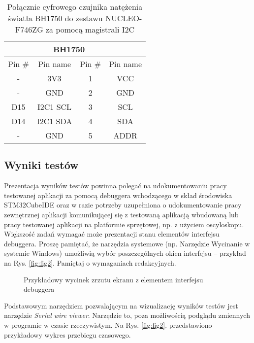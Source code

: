 \documentclass[11pt, a4paper]{article}
\begin{document}
\begin{table}[H]
\caption{Połącznie cyfrowego czujnika natężenia światła BH1750 do zestawu NUCLEO-F746ZG za pomocą magistrali I2C \cite{bh1750}}
\label{tab:tab1}
\centering
\begin{tabularx}{10cm}{ | >{\hsize=1.5cm}C | C | >{\hsize=1.5cm}C | C |}
  \hline
   &  \\ \hline
  Pin \# & Pin name & Pin \# & Pin name \\ \hline
  - & 3V3     & 1 & VCC \\
  - & GND      & 2 & GND \\
  D15 & I2C1 SCL & 3 & SCL \\
  D14 & I2C1 SDA & 4 & SDA \\
  - & GND      & 5 & ADDR \\
  \hline
\end{tabularx}
\end{table}


\subsection{Wyniki testów}
Prezentacja wyników testów powinna polegać na udokumentowaniu pracy testowanej aplikacji za pomocą debuggera wchodzącego w skład środowiska STM32CubeIDE \cite{ide} oraz w razie potrzeby uzupełniona o udokumentowanie pracy zewnętrznej aplikacji komunikującej się z testowaną aplikacją wbudowaną lub pracy testowanej aplikacji na platformie sprzętowej, np. z użyciem oscyloskopu. \\

Większość zadań wymagać może prezentacji stanu elementów interfejsu debuggera. Proszę pamiętać, że narzędzia systemowe (np. Narzędzie Wycinanie w systemie Windows) umożliwią wybór poszczególnych okien interfejsu – przykład na Rys. \ref{fig:fig2}. Pamiętaj o wymaganiach redakcyjnych.

\begin{figure}[H]
	\caption{Przykładowy wycinek zrzutu ekranu z elementem interfejsu debuggera}
	\label{fig:fig1}
\end{figure}

Podstawowym narzędziem pozwalającym na wizualizację wyników testów jest narzędzie \textit{Serial wire viewer}. Narzędzie to, poza możliwością podglądu zmiennych w programie w czasie rzeczywistym. Na Rys. \ref{fig:fig2}. przedstawiono przykładowy wykres przebiegu czasowego.
\end{document}

